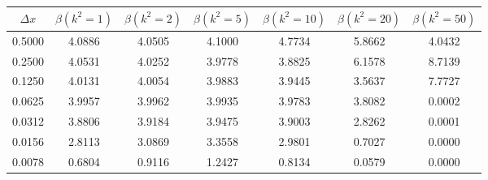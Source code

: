 \begin{tabular}{|c|c|c|c|c|c|c|}
\hline
\textbf{$\Delta x$}&\textbf{$\beta(k^2=1)$}&\textbf{$\beta(k^2=2)$}&\textbf{$\beta(k^2=5)$}&\textbf{$\beta(k^2=10)$}&\textbf{$\beta(k^2=20)$}&\textbf{$\beta(k^2=50)$}\\\hline
0.5000&4.0886&4.0505&4.1000&4.7734&5.8662&4.0432\\\hline
0.2500&4.0531&4.0252&3.9778&3.8825&6.1578&8.7139\\\hline
0.1250&4.0131&4.0054&3.9883&3.9445&3.5637&7.7727\\\hline
0.0625&3.9957&3.9962&3.9935&3.9783&3.8082&0.0002\\\hline
0.0312&3.8806&3.9184&3.9475&3.9003&2.8262&0.0001\\\hline
0.0156&2.8113&3.0869&3.3558&2.9801&0.7027&0.0000\\\hline
0.0078&0.6804&0.9116&1.2427&0.8134&0.0579&0.0000\\\hline
\end{tabular}
